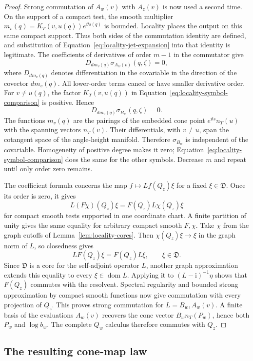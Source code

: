 \begin{proof}
Strong commutation of $A_w(v)$ with $A_z(v)$ is now used a second
time.  On the support of a compact test, the smooth multiplier
$m_v(q)=K_T(v,u(q))e^{\vartheta s(q)}$ is bounded.  Locality places
the output on this same compact support.  Thus both sides of the
commutation identity are defined, and substitution of
Equation~\eqref{eq:locality-jet-expansion} into that identity is
legitimate.  The coefficients of derivatives of order $m-1$ in the
commutator give
\[
 D_{d m_v(q)}\sigma_{A_w(v)}(q,\zeta)=0,
\]
where $D_{d m_v(q)}$ denotes differentiation in the covariable in
the direction of the covector $d m_v(q)$.  All lower-order terms
cancel or have smaller derivative order.  For $v\ne u(q)$, the
factor $K_T(v,u(q))$ in
Equation~\eqref{eq:locality-symbol-comparison} is positive.  Hence
\[
 D_{d m_v(q)}\sigma_{B_w}(q,\zeta)=0.
\]
The functions $m_v(q)$ are the pairings of the embedded cone point
$e^{\vartheta s}n_T(u)$ with the spanning vectors $n_T(v)$.
Their differentials, with $v\ne u$, span the cotangent space of the
angle-height manifold.  Therefore $\sigma_{B_w}$ is independent of
the covariable.  Homogeneity of positive degree makes it zero;
Equation~\eqref{eq:locality-symbol-comparison} does the same for
the other symbols.  Decrease $m$ and repeat until only order zero
remains.

The coefficient formula concerns the map $f\mapsto Lf(Q_z)\xi$ for a
fixed $\xi\in\mathfrak D$. Once its order is zero, it gives
\[
 L(F\chi)(Q_z)\xi=F(Q_z)L\chi(Q_z)\xi
\]
for compact smooth tests supported in one coordinate chart. A finite
partition of unity gives the same equality for arbitrary compact smooth
$F,\chi$. Take $\chi$ from the graph cutoffs of
Lemma~\ref{lem:locality-cores}. Then $\chi(Q_z)\xi\to\xi$ in the
graph norm of $L$, so closedness gives
\[
 LF(Q_z)\xi=F(Q_z)L\xi,\qquad \xi\in\mathfrak D.
\]
Since $\mathfrak D$ is a core for the self-adjoint operator $L$, another
graph approximation extends this equality to every $\xi\in\operatorname{dom}L$.
Applying it to $(L-\mathrm i)^{-1}\eta$ shows that $F(Q_z)$ commutes with
the resolvent. Spectral regularity and bounded strong approximation by
compact smooth functions now give commutation with every projection of $Q_z$. This proves strong commutation for $L=B_w,A_w(v)$. A finite basis
of the evaluations $A_w(v)$ recovers the cone vector $B_wn_T(P_w)$, hence
both $P_w$ and $\log b_w$. The complete $Q_w$ calculus therefore commutes
with $Q_z$.
\end{proof}

\subsection{The resulting cone-map law}


